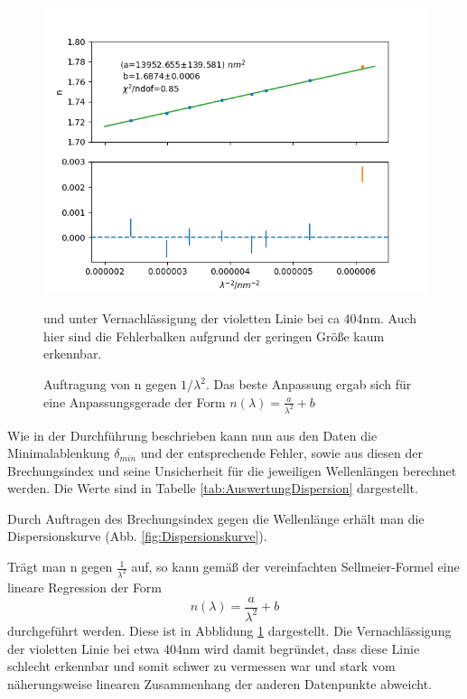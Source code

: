 \documentclass[12pt,a4paper]{article}
\begin{document}
	\begin{figure}
		\includegraphics[scale=1.0]{Bilder/Regression.png}
		\caption{Auftragung von n gegen $1/\lambda^2$. Das beste Anpassung ergab sich für eine Anpassungsgerade der Form $n(\lambda) = \frac{a}{\lambda^2} + b $} und unter Vernachlässigung der violetten Linie bei ca 404nm. Auch hier sind die Fehlerbalken aufgrund der geringen Größe kaum erkennbar.
		\label{fig:RegressionDispersion}
	\end{figure}
	
	
	Wie in der Durchführung beschrieben kann nun aus den Daten die Minimalablenkung $\delta_{min}$ und der entsprechende Fehler, sowie aus diesen der Brechungsindex und seine Unsicherheit für die jeweiligen Wellenlängen berechnet werden.
	Die Werte sind in Tabelle \ref{tab:AuswertungDispersion} dargestellt.
	
	Durch Auftragen des Brechungsindex gegen die Wellenlänge erhält man die Dispersionskurve (Abb. \ref{fig:Dispersionskurve}).
	
Trägt man n gegen $\frac{1}{\lambda^2}$ auf, so kann gemäß der vereinfachten Sellmeier-Formel eine lineare Regression der Form
\begin{equation}
n(\lambda) = \dfrac{a}{\lambda^2} + b
\label{eq:linreg_Prisma}
\end{equation} durchgeführt werden. Diese ist in Abblidung
\ref{fig:RegressionDispersion} dargestellt. Die Vernachlässigung der violetten Linie bei etwa 404nm wird damit begründet, dass diese Linie schlecht erkennbar und somit schwer zu vermessen war und stark vom näherungsweise linearen Zusammenhang der anderen Datenpunkte abweicht.
\end{document}
